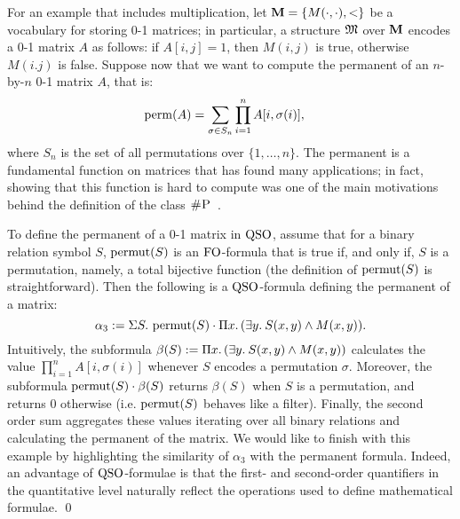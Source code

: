 \begin{exa}\label{exa-perm}
For an example that includes multiplication, let $\mathbf{M} = \{M(\cdot,\cdot),<\}$ be a vocabulary for storing 0-1 matrices; in particular, a structure $\mathfrak{M}$ over $\mathbf{M}$ encodes a 0-1 matrix $A$ as follows: if $A[i,j] = 1$, then $M(i,j)$ is true, otherwise $M(i.j)$ is false.
Suppose now that we want to compute the permanent of an $n$-by-$n$ 0-1 matrix $A$, that is:
\begin{align*}
\operatorname{perm}(A) &= \sum_{\sigma \in S_n} \prod_{i=1}^n A[i, \sigma(i)],  
\end{align*}
where $S_n$ is the set of all permutations over $\{1, \ldots, n\}$.
The permanent is a fundamental function on matrices that has found many applications;
in fact, showing that this function is hard to compute was one of the main motivations behind the definition of the class $\text{\sc \#P}$~\cite{Valiant79}.

To define the permanent of a 0-1 matrix in ${\rm QSO}$, assume that for a binary relation symbol $S$, $\operatorname{permut}(S)$ is an ${\rm FO}$-formula that is true if, and only if, $S$ is a permutation, namely, a total bijective function (the definition of $\operatorname{permut}(S)$ is straightforward).
Then the following is a ${\rm QSO}$-formula defining the permanent of a matrix:
\[
\alpha_3 := \Sigma{S}.\, \operatorname{permut}(S) \cdot \Pi{x}.\, (\exists{y}.\: S(x,y) \wedge M(x,y)).
\]
Intuitively, the subformula $\beta(S) := \Pi{x}.\, (\exists{y}.\: S(x,y) \wedge M(x,y))$ calculates the value \linebreak $\prod_{i=1}^n A[i, \sigma(i)]$ whenever $S$ encodes a permutation $\sigma$.
Moreover, the subformula $\operatorname{permut}(S) \cdot \beta(S)$ returns $\beta(S)$ when $S$ is a permutation, and returns $0$ otherwise (i.e. $\operatorname{permut}(S)$ behaves like a filter). 
Finally, the second order sum aggregates these values iterating over all binary relations and calculating the permanent of the matrix.
We would like to finish with this example by highlighting the similarity of $\alpha_3$ with the permanent formula. 
Indeed, an advantage of ${\rm QSO}$-formulae is that the first- and second-order quantifiers in the quantitative level naturally reflect the operations used to define mathematical formulae. \qed
\end{exa}

